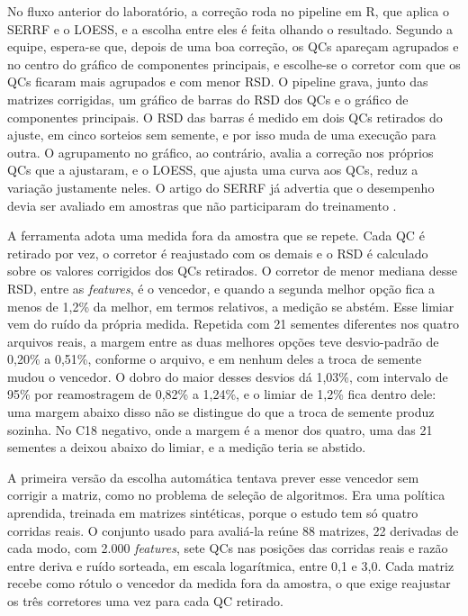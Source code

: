 No fluxo anterior do laboratório, a correção roda no pipeline em R, que aplica o SERRF e o LOESS, e a escolha entre eles é feita olhando o resultado. Segundo a equipe, espera-se que, depois de uma boa correção, os QCs apareçam agrupados e no centro do gráfico de componentes principais, e escolhe-se o corretor com que os QCs ficaram mais agrupados e com menor RSD. O pipeline grava, junto das matrizes corrigidas, um gráfico de barras do RSD dos QCs e o gráfico de componentes principais. O RSD das barras é medido em dois QCs retirados do ajuste, em cinco sorteios sem semente, e por isso muda de uma execução para outra. O agrupamento no gráfico, ao contrário, avalia a correção nos próprios QCs que a ajustaram, e o LOESS, que ajusta uma curva aos QCs, reduz a variação justamente neles. O artigo do SERRF já advertia que o desempenho devia ser avaliado em amostras que não participaram do treinamento \cite{fan2019systematic}.

A ferramenta adota uma medida fora da amostra que se repete. Cada QC é retirado por vez, o corretor é reajustado com os demais e o RSD é calculado sobre os valores corrigidos dos QCs retirados. O corretor de menor mediana desse RSD, entre as \emph{features}, é o vencedor, e quando a segunda melhor opção fica a menos de 1,2\% da melhor, em termos relativos, a medição se abstém. Esse limiar vem do ruído da própria medida. Repetida com 21 sementes diferentes nos quatro arquivos reais, a margem entre as duas melhores opções teve desvio-padrão de 0,20\% a 0,51\%, conforme o arquivo, e em nenhum deles a troca de semente mudou o vencedor. O dobro do maior desses desvios dá 1,03\%, com intervalo de 95\% por reamostragem de 0,82\% a 1,24\%, e o limiar de 1,2\% fica dentro dele: uma margem abaixo disso não se distingue do que a troca de semente produz sozinha. No C18 negativo, onde a margem é a menor dos quatro, uma das 21 sementes a deixou abaixo do limiar, e a medição teria se abstido.

A primeira versão da escolha automática tentava prever esse vencedor sem corrigir a matriz, como no problema de seleção de algoritmos. Era uma política aprendida, treinada em matrizes sintéticas, porque o estudo tem só quatro corridas reais. O conjunto usado para avaliá-la reúne 88 matrizes, 22 derivadas de cada modo, com 2.000 \emph{features}, sete QCs nas posições das corridas reais e razão entre deriva e ruído sorteada, em escala logarítmica, entre 0,1 e 3,0. Cada matriz recebe como rótulo o vencedor da medida fora da amostra, o que exige reajustar os três corretores uma vez para cada QC retirado.


